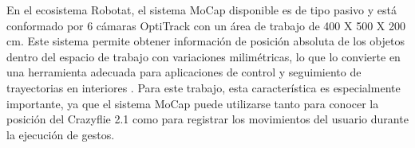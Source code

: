 En el ecosistema Robotat, el sistema MoCap disponible es de tipo pasivo y está conformado por  6 cámaras OptiTrack con un área de trabajo de 400 X 500 X 200 cm. Este sistema permite obtener información de posición absoluta de los objetos dentro del espacio de trabajo con variaciones milimétricas, lo que lo convierte en una herramienta adecuada para aplicaciones de control y seguimiento de trayectorias en interiores \cite{schwendener2025desarrollo}. Para este trabajo, esta característica es especialmente importante, ya que el sistema MoCap puede utilizarse tanto para conocer la posición del Crazyflie 2.1 como para registrar los movimientos del usuario durante la ejecución de gestos.

